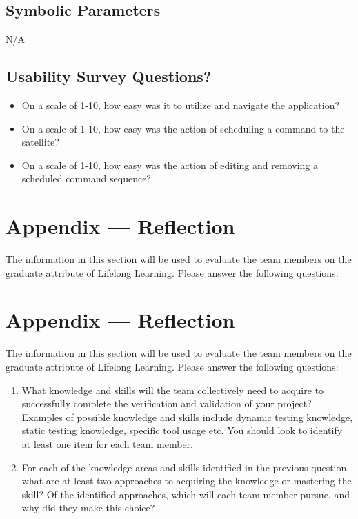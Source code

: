 \documentclass[12pt, titlepage]{article}
\begin{document}
\subsection{Symbolic Parameters}

N/A

\subsection{Usability Survey Questions?}

\begin{itemize}
    \item On a scale of 1-10, how easy was it to utilize and navigate the application?
    \item On a scale of 1-10, how easy was the action of scheduling a command to the satellite?
    \item On a scale of 1-10, how easy was the action of editing and removing a scheduled command sequence?
\end{itemize}

\newpage{}
\section*{Appendix --- Reflection}

The information in this section will be used to evaluate the team members on the
graduate attribute of Lifelong Learning.  Please answer the following questions:

\newpage{}
\section*{Appendix --- Reflection}


The information in this section will be used to evaluate the team members on the
graduate attribute of Lifelong Learning.  Please answer the following questions:

\begin{enumerate}
  \item What knowledge and skills will the team collectively need to acquire to
  successfully complete the verification and validation of your project?
  Examples of possible knowledge and skills include dynamic testing knowledge,
  static testing knowledge, specific tool usage etc.  You should look to
  identify at least one item for each team member.
  \item For each of the knowledge areas and skills identified in the previous
  question, what are at least two approaches to acquiring the knowledge or
  mastering the skill?  Of the identified approaches, which will each team
  member pursue, and why did they make this choice?
\end{enumerate}
\end{document}
